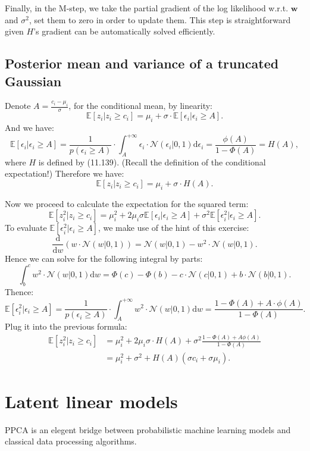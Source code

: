 \documentclass[UTF8]{ctexart}
\begin{document}
Finally, in the M-step, we take the partial gradient of the log likelihood w.r.t. $\textbf{w}$ and $\sigma^{2}$, set them to zero in order to update them.
This step is straightforward given $H$'s gradient can be automatically solved efficiently.

\subsection{Posterior mean and variance of a truncated Gaussian}
Denote $A=\frac{c_{i}-\mu_{i}}{\sigma}$, for the conditional mean, by linearity:
$$\mathbb{E}[z_{i}|z_{i} \geq c_{i}]=\mu_{i}+\sigma\cdot \mathbb{E}[\epsilon_{i}|\epsilon_{i} \geq A].$$
And we have:
$$\mathbb{E}[\epsilon_{i}|\epsilon_{i}\geq A]=\frac{1}{p(\epsilon_{i} \geq A)}\cdot\int_{A}^{+\infty}\epsilon_{i}\cdot\mathcal{N}(\epsilon_{i}|0,1)\text{d}\epsilon_{i}=\frac{\phi(A)}{1-\Phi(A)}=H(A),$$
where $H$ is defined by (11.139).
(Recall the definition of the conditional expectation!)
Therefore we have:
$$\mathbb{E}[z_{i}|z_{i} \geq c_{i}]=\mu_{i}+\sigma\cdot H(A).$$

Now we proceed to calculate the expectation for the squared term:
$$\mathbb{E}[z_{i}^{2}|z_{i} \geq c_{i}]=\mu_{i}^{2} + 2\mu_{i}\sigma \mathbb{E}[\epsilon_{i}|\epsilon_{i} \geq A] + \sigma^{2}\mathbb{E}[\epsilon_{i}^{2}|\epsilon_{i} \geq A].$$
To evaluate $\mathbb{E}[\epsilon_{i}^{2}|\epsilon_{i} \geq A]$, we make use of the hint of this exercise:
$$\frac{\text{d}}{\text{d}w}(w\cdot\mathcal{N}(w|0,1))=\mathcal{N}(w|0,1)-w^{2}\cdot\mathcal{N}(w|0,1).$$
Hence we can solve for the following integral by parts:
$$\int_{b}^{c}w^{2}\cdot\mathcal{N}(w|0,1)\text{d}w=\Phi(c)-\Phi(b)-c\cdot\mathcal{N}(c|0,1)+b\cdot\mathcal{N}(b|0,1).$$
Thence:
$$\mathbb{E}[\epsilon_{i}^{2}|\epsilon_{i} \geq A]=\frac{1}{p(\epsilon_{i}\geq A)}\cdot\int_{A}^{+\infty}w^{2}\cdot\mathcal{N}(w|0,1)\text{d}w=\frac{1-\Phi(A)+A\cdot\phi(A)}{1-\Phi(A)}.$$
Plug it into the previous formula:
$$
\begin{aligned}
\mathbb{E}[z_{i}^{2}|z_{i} \geq c_{i}]&=\mu_{i}^{2}+2\mu_{i}\sigma \cdot H(A) + \sigma^{2}\frac{1-\Phi(A)+A\phi(A)}{1-\Phi(A)}\\
&=\mu_{i}^{2} + \sigma^{2} + H(A)(\sigma c_{i} + \sigma \mu_{i}).
\end{aligned}
$$


\newpage
\section{Latent linear models}
PPCA is an elegent bridge between probabilistic machine learning models and classical data processing algorithms.
\end{document}
